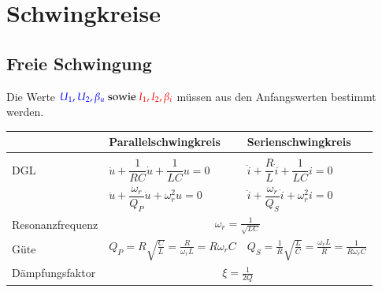 \section{Schwingkreise}
\subsection{Freie Schwingung}
Die Werte $\textcolor{blue}{U_1,U_2,\beta_u}\text{ sowie
}\textcolor{red}{I_1,I_2,\beta_i}$ müssen aus den Anfangswerten bestimmt
werden.\\
\renewcommand{\arraystretch}{2.5}
\begin{tabular}{| p{4cm} | p{7cm} | p{7cm} |}
	\hline
		& \textbf{Parallelschwingkreis} 
		& \textbf{Serienschwingkreis} \\
	\hline
	& 
	& \\
	\hline
	DGL &
  $\ddot{u} + \dfrac{1}{RC} \dot{u} + \dfrac{1}{LC} u = 0$
  & $\ddot{i} + \dfrac{R}{L} \dot{i} + \dfrac{1}{LC} i = 0$\\
  & $\ddot{u} + \dfrac{\omega_r}{Q_P} \dot{u} + \omega_r^2 u = 0$
  & $\ddot{i} + \dfrac{\omega_r}{Q_S} \dot{i} + \omega_r^2 i = 0$\\
	\hline
	Resonanzfrequenz & \multicolumn{2}{|c|}{$\omega_r =
	\frac{1}{\sqrt{LC}}$} \\
	\hline
	Güte & 
	$Q_P = R\sqrt{\frac{C}{L}} = \frac{R}{\omega_r L}=R\omega_rC$ &
	$Q_S = \frac{1}{R}\sqrt{\frac{L}{C}} = \frac{\omega_r
	L}{R}=\frac{1}{R\omega_rC}$\\
	\hline
	Dämpfungsfaktor & \multicolumn{2}{|c|}{$\xi=\frac{1}{2Q}$} \\
	\hline
	

\end{tabular}
